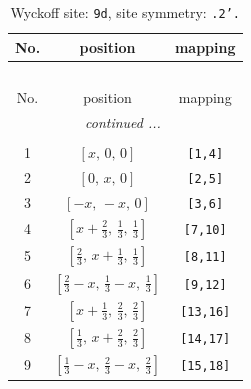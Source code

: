 \documentclass[fleqn,8pt]{jsarticle}
\begin{document}
\begin{longtable}{ccc}
\caption{Wyckoff site: {\tt 9d}, site symmetry: {\tt .2'.}}
 \\
 \hline \hline
No. & position & mapping \\ \hline \endfirsthead

\multicolumn{2}{l}{\tablename\ \thetable{}} \\
 \hline \hline
No. & position & mapping \\ \hline \endhead

 \hline \hline
\multicolumn{2}{r}{\footnotesize\it continued ...} \\ \endfoot

 \hline \hline
\multicolumn{2}{r}{} \\ \endlastfoot

1 & $\left[ x,\, 0,\, 0 \right]$ & {\tt [1,4]} \\ \hline
2 & $\left[ 0,\, x,\, 0 \right]$ & {\tt [2,5]} \\ \hline
3 & $\left[ - x,\, - x,\, 0 \right]$ & {\tt [3,6]} \\ \hline
4 & $\left[ x + \frac{2}{3},\, \frac{1}{3},\, \frac{1}{3} \right]$ & {\tt [7,10]} \\ \hline
5 & $\left[ \frac{2}{3},\, x + \frac{1}{3},\, \frac{1}{3} \right]$ & {\tt [8,11]} \\ \hline
6 & $\left[ \frac{2}{3} - x,\, \frac{1}{3} - x,\, \frac{1}{3} \right]$ & {\tt [9,12]} \\ \hline
7 & $\left[ x + \frac{1}{3},\, \frac{2}{3},\, \frac{2}{3} \right]$ & {\tt [13,16]} \\ \hline
8 & $\left[ \frac{1}{3},\, x + \frac{2}{3},\, \frac{2}{3} \right]$ & {\tt [14,17]} \\ \hline
9 & $\left[ \frac{1}{3} - x,\, \frac{2}{3} - x,\, \frac{2}{3} \right]$ & {\tt [15,18]} \\
\end{longtable}
\renewcommand{\arraystretch}{1.2}
\end{document}
